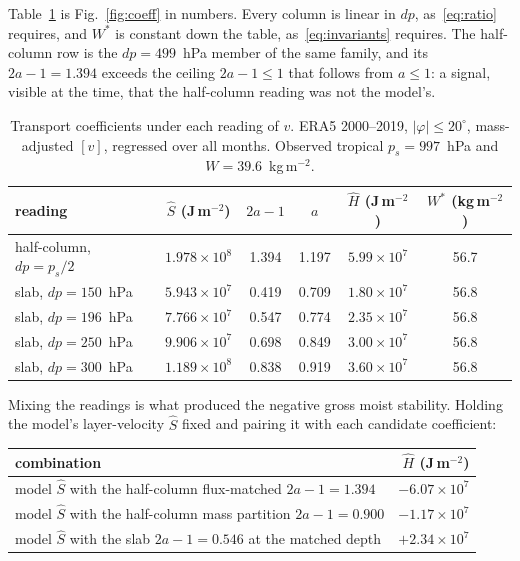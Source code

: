 \documentclass[11pt]{article}
\newcommand{\Shat}{\hat S}
\newcommand{\Hhat}{\hat H}
\newcommand{\Wstar}{W^*}
\begin{document}
Table~\ref{tab:readings} is Fig.~\ref{fig:coeff} in numbers. Every column is
linear in $dp$, as~\eqref{eq:ratio} requires, and $\Wstar$ is constant down the
table, as~\eqref{eq:invariants} requires. The half-column row is the $dp =
499$~hPa member of the same family, and its $2a-1 = 1.394$ exceeds the ceiling
$2a-1 \le 1$ that follows from $a \le 1$: a signal, visible at the time, that
the half-column reading was not the model's.

\begin{table}[htbp]
\centering
\caption{Transport coefficients under each reading of $v$. ERA5 2000--2019,
$|\varphi|\le20^\circ$, mass-adjusted $[v]$, regressed over all months. Observed
tropical $p_s = 997$~hPa and $W = 39.6$~kg\,m$^{-2}$.}
\label{tab:readings}
\begin{tabular}{lccccc}
\toprule
reading & $\Shat$ (J\,m$^{-2}$) & $2a-1$ & $a$ & $\Hhat$ (J\,m$^{-2}$)
& $\Wstar$ (kg\,m$^{-2}$) \\
\midrule
half-column, $dp = p_s/2$ & $1.978\times10^{8}$ & 1.394 & 1.197 & $5.99\times10^{7}$ & 56.7 \\
slab, $dp = 150$~hPa      & $5.943\times10^{7}$ & 0.419 & 0.709 & $1.80\times10^{7}$ & 56.8 \\
slab, $dp = 196$~hPa      & $7.766\times10^{7}$ & 0.547 & 0.774 & $2.35\times10^{7}$ & 56.8 \\
slab, $dp = 250$~hPa      & $9.906\times10^{7}$ & 0.698 & 0.849 & $3.00\times10^{7}$ & 56.8 \\
slab, $dp = 300$~hPa      & $1.189\times10^{8}$ & 0.838 & 0.919 & $3.60\times10^{7}$ & 56.8 \\
\bottomrule
\end{tabular}
\end{table}

Mixing the readings is what produced the negative gross moist stability.
Holding the model's layer-velocity $\Shat$ fixed and pairing it with each
candidate coefficient:

\begin{center}
\begin{tabular}{lr}
\toprule
combination & $\Hhat$ (J\,m$^{-2}$)\\
\midrule
model $\Shat$ with the half-column flux-matched $2a-1 = 1.394$ & $-6.07\times10^{7}$\\
model $\Shat$ with the half-column mass partition $2a-1 = 0.900$ & $-1.17\times10^{7}$\\
model $\Shat$ with the slab $2a-1 = 0.546$ at the matched depth & $+2.34\times10^{7}$\\
\bottomrule
\end{tabular}
\end{center}
\end{document}
